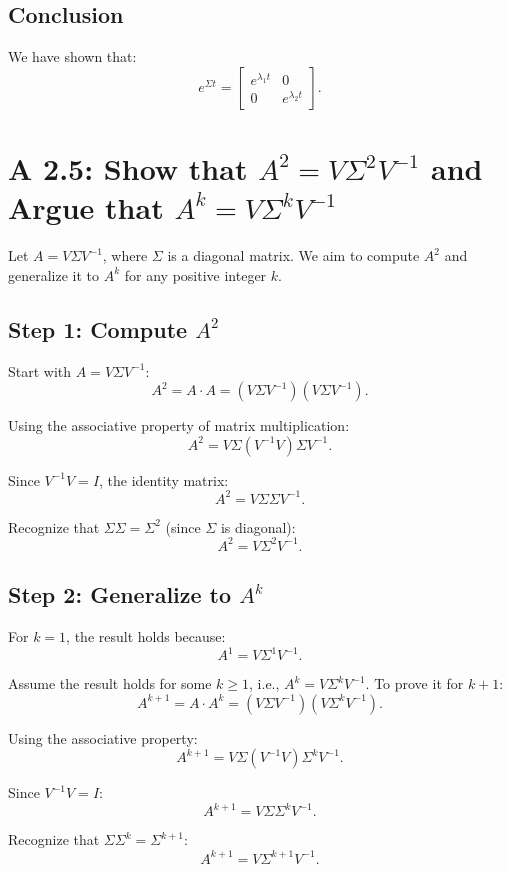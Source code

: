 \documentclass[12pt]{article}
\begin{document}
\subsection*{Conclusion}

We have shown that:
\[
e^{\Sigma t} = \begin{bmatrix} e^{\lambda_1 t} & 0 \\ 0 & e^{\lambda_2 t} \end{bmatrix}.
\]

\section*{A 2.5: Show that \(A^2 = V \Sigma^2 V^{-1}\) and Argue that \(A^k = V \Sigma^k V^{-1}\)}

Let \(A = V \Sigma V^{-1}\), where \(\Sigma\) is a diagonal matrix. We aim to compute \(A^2\) and generalize it to \(A^k\) for any positive integer \(k\).

\subsection*{Step 1: Compute \(A^2\)}

Start with \(A = V \Sigma V^{-1}\):
\[
A^2 = A \cdot A = (V \Sigma V^{-1}) (V \Sigma V^{-1}).
\]

Using the associative property of matrix multiplication:
\[
A^2 = V \Sigma (V^{-1} V) \Sigma V^{-1}.
\]

Since \(V^{-1} V = I\), the identity matrix:
\[
A^2 = V \Sigma \Sigma V^{-1}.
\]

Recognize that \(\Sigma \Sigma = \Sigma^2\) (since \(\Sigma\) is diagonal):
\[
A^2 = V \Sigma^2 V^{-1}.
\]

\subsection*{Step 2: Generalize to \(A^k\)}

For \(k = 1\), the result holds because:
\[
A^1 = V \Sigma^1 V^{-1}.
\]

Assume the result holds for some \(k \geq 1\), i.e., \(A^k = V \Sigma^k V^{-1}\). To prove it for \(k+1\):
\[
A^{k+1} = A \cdot A^k = (V \Sigma V^{-1})(V \Sigma^k V^{-1}).
\]

Using the associative property:
\[
A^{k+1} = V \Sigma (V^{-1} V) \Sigma^k V^{-1}.
\]

Since \(V^{-1} V = I\):
\[
A^{k+1} = V \Sigma \Sigma^k V^{-1}.
\]

Recognize that \(\Sigma \Sigma^k = \Sigma^{k+1}\):
\[
A^{k+1} = V \Sigma^{k+1} V^{-1}.
\]
\end{document}
